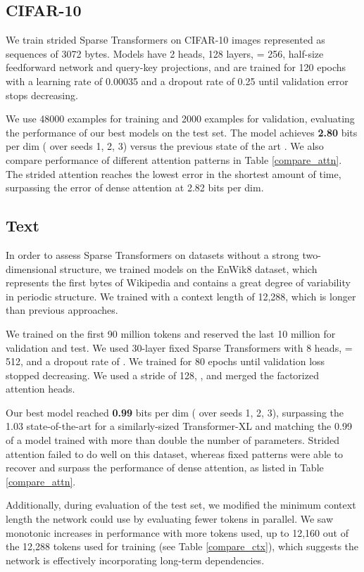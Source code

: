 \documentclass{article}
\begin{document}
\subsection{CIFAR-10}

We train strided Sparse Transformers on CIFAR-10 images represented as sequences of 3072 bytes. Models have 2 heads, 128 layers,  = 256, half-size feedforward network and query-key projections, and are trained for 120 epochs with a learning rate of 0.00035 and a dropout rate of 0.25 until validation error stops decreasing.

We use 48000 examples for training and 2000 examples for validation, evaluating the performance of our best models on the test set. The model achieves \textbf{2.80} bits per dim ( over seeds 1, 2, 3) versus the previous  state of the art \cite{chen2017pixelsnail}. We also compare performance of different attention patterns in Table \ref{compare_attn}. The strided attention reaches the lowest error in the shortest amount of time, surpassing the error of dense attention at 2.82 bits per dim.

\subsection{Text}
In order to assess Sparse Transformers on datasets without a strong two-dimensional structure, we trained models on the EnWik8 dataset, which represents the first  bytes of Wikipedia and contains a great degree of variability in periodic structure. We trained with a context length of 12,288, which is longer than previous approaches.

We trained on the first 90 million tokens and reserved the last 10 million for validation and test. We used 30-layer fixed Sparse Transformers with 8 heads,  = 512, and a dropout rate of . We trained for 80 epochs until validation loss stopped decreasing. We used a stride of 128, , and merged the factorized attention heads.

Our best model reached \textbf{0.99} bits per dim ( over seeds 1, 2, 3), surpassing the 1.03 state-of-the-art for a similarly-sized Transformer-XL  \cite{dai2018transformer} and matching the 0.99 of a model trained with more than double the number of parameters. Strided attention failed to do well on this dataset, whereas fixed patterns were able to recover and surpass the performance of dense attention, as listed in Table \ref{compare_attn}.

Additionally, during evaluation of the test set, we modified the minimum context length the network could use by evaluating fewer tokens in parallel. We saw monotonic increases in performance with more tokens used, up to 12,160 out of the 12,288 tokens used for training (see Table \ref{compare_ctx}), which suggests the network is effectively incorporating long-term dependencies.
\end{document}
